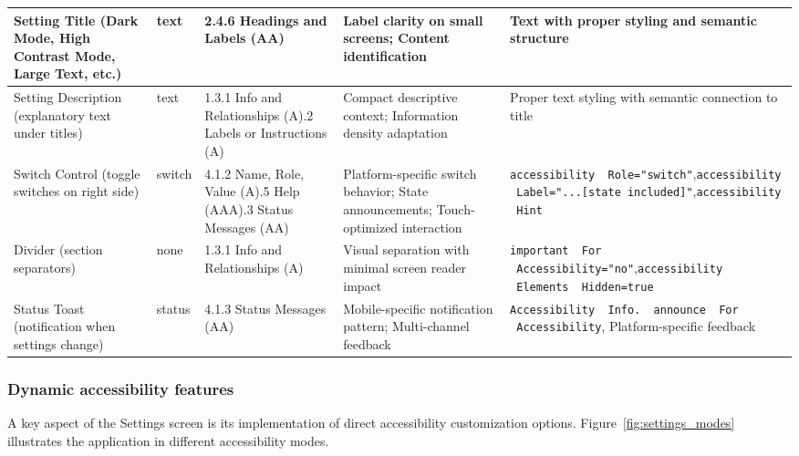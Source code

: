\begin{longtable}[c]{|C{2.5cm}|C{1.8cm}|C{2.8cm}|C{3.2cm}|C{4.5cm}|}
\hline
Setting Title (Dark Mode, High Contrast Mode, Large Text, etc.) & text & 2.4.6 Headings and Labels (AA) & Label clarity on small screens; Content identification & Text with proper styling and semantic structure \\
\hline
Setting Description (explanatory text under titles) & text & 1.3.1 Info and Relationships (A).2 Labels or Instructions (A) & Compact descriptive context; Information density adaptation & Proper text styling with semantic connection to title \\
\hline
Switch Control (toggle switches on right side) & switch & 4.1.2 Name, Role, Value (A).5 Help (AAA).3 Status Messages (AA) & Platform-specific switch behavior; State announcements; Touch-optimized interaction & \texttt{accessibility \ Role="switch"},\newline \texttt{accessibility \ Label="...[state included]"},\newline \texttt{accessibility \ Hint} \\
\hline
Divider (section separators) & none & 1.3.1 Info and Relationships (A) & Visual separation with minimal screen reader impact & \texttt{important \ For \ Accessibility="no"},\newline \texttt{accessibility \ Elements \ Hidden=true} \\
\hline
Status Toast (notification when settings change) & status & 4.1.3 Status Messages (AA) & Mobile-specific notification pattern; Multi-channel feedback & \texttt{Accessibility \ Info. \ announce \ For \ Accessibility}, Platform-specific feedback \\
\end{longtable}

\FloatBarrier

\subsubsection{Dynamic accessibility features}

A key aspect of the Settings screen is its implementation of direct accessibility customization options. Figure~\ref{fig:settings_modes} illustrates the application in different accessibility modes.

